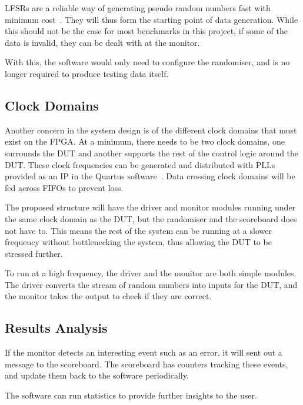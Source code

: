 LFSRs are a reliable way of generating pseudo random numbers fast with minimum
cost~\cite{Hazwani1}.
They will thus form the starting point of data generation.
While this should not be the case for most benchmarks in this project, if some
of the data is invalid, they can be dealt with at the monitor.

With this, the software would only need to configure the randomiser, and is
no longer required to produce testing data itself.

\subsection{Clock Domains}
Another concern in the system design is of the different clock domains that
must exist on the FPGA.
At a minimum, there needs to be two clock domains, one surrounds the DUT and
another supports the rest of the control logic around the DUT.
These clock frequencies can be generated and distributed with PLLs provided as
an IP in the Quartus software~\cite{Altera4}.
Data crossing clock domains will be fed across FIFOs to prevent loss.

The proposed structure will have the driver and monitor modules running under
the same clock domain as the DUT, but the randomiser and the scoreboard does
not have to.
This means the rest of the system can be running at a slower frequency without
bottlenecking the system, thus allowing the DUT to be stressed further.

To run at a high frequency, the driver and the monitor are both simple modules.
The driver converts the stream of random numbers into inputs for the DUT, and
the monitor takes the output to check if they are correct.

\subsection{Results Analysis}
If the monitor detects an interesting event such as an error, it will sent out
a message to the scoreboard.
The scoreboard has counters tracking these events, and update them back to the
software periodically.

The software can run statistics to provide further insights to the user.
